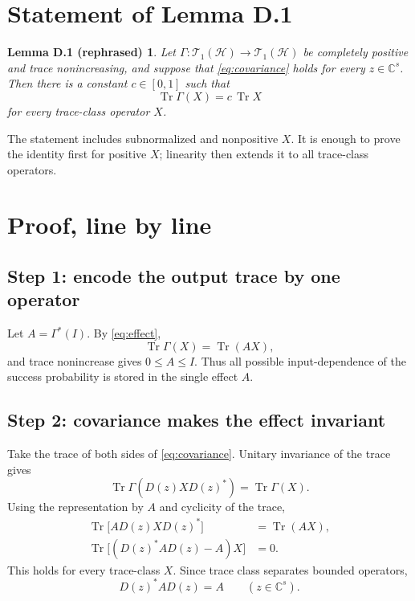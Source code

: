 \documentclass[11pt]{article}
\newcommand{\Hc}{\mathcal H}
\newcommand{\T}{\mathcal T_1}
\newcommand{\C}{\mathbb C}
\newcommand{\Tr}{\operatorname{Tr}}
\newtheorem*{lemmaD}{Lemma D.1 (rephrased)}
\begin{document}
\section{Statement of Lemma D.1}

\begin{lemmaD}
Let $\Gamma:\T(\Hc)\to\T(\Hc)$ be completely positive and trace
nonincreasing, and suppose that \eqref{eq:covariance} holds for every
$z\in\C^s$.  Then there is a constant $c\in[0,1]$ such that
\begin{equation}\label{eq:constant-trace}
  \Tr\Gamma(X)=c\,\Tr X
\end{equation}
for every trace-class operator $X$.
\end{lemmaD}

The statement includes subnormalized and nonpositive $X$.  It is enough to
prove the identity first for positive $X$; linearity then extends it to all
trace-class operators.

\section{Proof, line by line}

\subsection*{Step 1: encode the output trace by one operator}

Let $A=\Gamma^*(I)$.  By \eqref{eq:effect},
\[
  \Tr\Gamma(X)=\Tr(AX),
\]
and trace nonincrease gives $0\leq A\leq I$.  Thus all possible
input-dependence of the success probability is stored in the single effect
$A$.

\subsection*{Step 2: covariance makes the effect invariant}

Take the trace of both sides of \eqref{eq:covariance}.  Unitary invariance of
the trace gives
\[
  \Tr\Gamma(D(z)XD(z)^*)=\Tr\Gamma(X).
\]
Using the representation by $A$ and cyclicity of the trace,
\begin{align*}
  \Tr\bigl[A D(z)XD(z)^*\bigr]
  &=\Tr(AX),\\
  \Tr\bigl[(D(z)^*AD(z)-A)X\bigr]&=0.
\end{align*}
This holds for every trace-class $X$.  Since trace class separates bounded
operators,
\begin{equation}\label{eq:A-invariant}
  D(z)^*AD(z)=A
  \qquad(z\in\C^s).
\end{equation}
\end{document}
